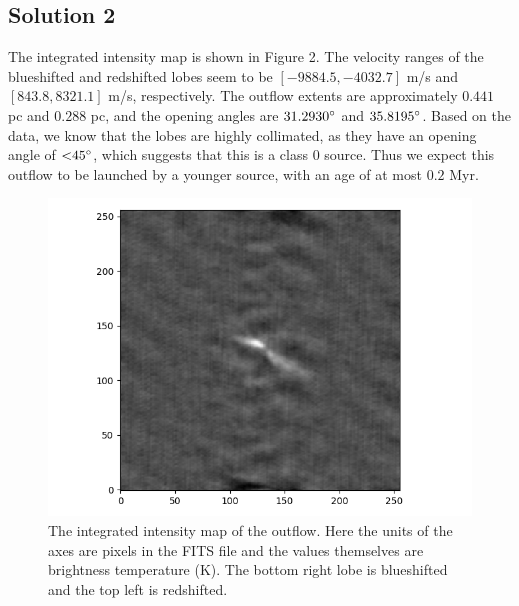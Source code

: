 \documentclass[11pt]{article}
\newenvironment{tight_enumerate}{
    \begin{enumerate}[label=(\alph*)]
    \setlength{\itemsep}{3pt}
    \setlength{\parskip}{0pt}}
    {\end{enumerate}}
\begin{document}
\subsection*{Solution 2}
\begin{tight_enumerate}
\item The integrated intensity map is shown in Figure 2. The velocity ranges of the blueshifted and redshifted lobes seem to be $[{-}9884.5,{-}4032.7]$ \si{\meter/\second} and $[843.8,8321.1]$ \si{\meter/\second}, respectively. 
The outflow extents are approximately $0.441$ \si{pc} and $0.288$ \si{pc}, 
and the opening angles are $31.2930\degree$ and $35.8195\degree$. 
Based on the data, we know that the lobes are highly collimated, as they have an opening angle of ${<}45\degree$, which suggests that this is a class $0$ source. Thus we expect this outflow to be launched by a younger source, with an age of at most $0.2$ \si{Myr}.

\begin{figure}[h]
\centering
\includegraphics[height=0.275\textheight]{intensity.png}
\vspace{-1em}
\caption{The integrated intensity map of the outflow. Here the units of the axes are pixels in the FITS file and the values themselves are brightness temperature (\si{\kelvin}). The bottom right lobe is blueshifted and the top left is redshifted.}
\end{figure}


\end{tight_enumerate}
\end{document}
